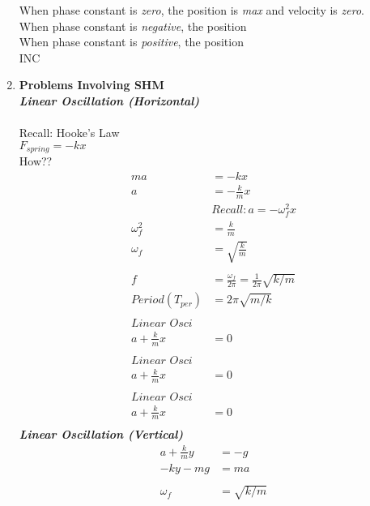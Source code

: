 \documentclass{article}
\begin{document}
\begin{enumerate}
    When phase constant is  \textit{zero}, the position is \textit{max} and velocity is \textit{zero}. \\
    When phase constant is  \textit{negative}, the position \\
    When phase constant is  \textit{positive}, the position \\
    INC \\
    \item \textbf{Problems Involving SHM} \\
    \textit{\textbf{Linear Oscillation (Horizontal)}} \\
    \\
    Recall: Hooke's Law \\
    $F_{spring}=-kx$ \\
    How?? \\
    \begin{align*} 
        ma&=-kx \\
        a&=-\frac{k}{m}x \\
        &Recall: a=-\omega_f^2x\\
        \omega_f^2&=\frac{k}{m} \\
        \omega_f&=\sqrt{\frac{k}{m}} \\
        \\
        f&=\frac{\omega_f}{2\pi}=\frac{1}{2\pi}\sqrt{k/m} \\
        Period(T_{per})&=2\pi\sqrt{m/k} \\
        \\
        \textit{Linear Osci} \\
        a+\frac{k}{m}x&=0 \\
        \\
        \textit{Linear Osci} \\
        a+\frac{k}{m}x&=0 \\
        \\
        \textit{Linear Osci} \\
        a+\frac{k}{m}x&=0 \\
    \end{align*}
    \textit{\textbf{Linear Oscillation (Vertical)}} \\
    \begin{align*}
        a+\frac{k}{m}y&=-g \\
        -ky-mg&=ma \\
        \\
        \omega_f&=\sqrt{k/m} \\ 
    \end{align*}

\end{enumerate}
\end{document}

